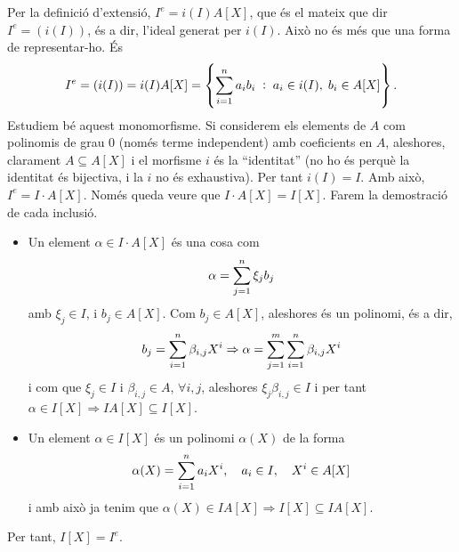 \documentclass[../main.tex]{subfiles}
\begin{document}
\begin{sol}
\begin{enumerate}[(a)]
    Per la definició d'extensió, $I^{e} = i(I) A[X]$, que és el mateix que dir $I^{e} = (i(I))$, és a dir, l'ideal generat per $i(I)$. Això no és més que una forma de representar-ho. És
    \begin{equation}
        \notag 
        I^{e}=(i(I)) = i(I)A[X] = \left\{\sum_{i=1}^n a_ib_i\;:\;a_i\in i(I),\;b_i\in A[X]\right\}.
    \end{equation}
    Estudiem bé aquest monomorfisme. Si considerem els elements de $A$ com polinomis de grau 0 (només terme independent) amb coeficients en $A$, aleshores, clarament $A\subseteq A[X]$ i el morfisme $i$ és la ``identitat'' (no ho és perquè la identitat és bijectiva, i la $i$ no és exhaustiva). Per tant $i(I) = I$. Amb això, $I^{e} = I\cdotp A[X]$. Només queda veure que $I\cdotp A[X] = I[X]$. Farem la demostració de cada inclusió.
    \begin{itemize}
        \item \fbox{$\subseteq$} Un element $\alpha\in I\cdotp A[X]$ és una cosa com
        \begin{equation}
            \notag
            \alpha = \sum_{j=1}^n\xi_jb_j
        \end{equation}
        amb $\xi_j\in I$, i $b_j\in A[X]$. Com $b_j\in A[X]$, aleshores és un polinomi, és a dir,
        \begin{equation}
            \notag
            b_j = \sum_{i=1}^n\beta_{i,j}X^{i}\Rightarrow \alpha = \sum_{j=1}^m\sum_{i=1}^n\beta_{i,j}X^{i}
        \end{equation}
        i com que $\xi_j\in I$ i $\beta_{i,j}\in A$, $\forall i,j$, aleshores $\xi_j\beta_{i,j}\in I$ i per tant $\alpha\in I[X]\Rightarrow IA[X]\subseteq I[X]$.
        \item \fbox{$\supseteq$} Un element $\alpha\in I[X]$ és un polinomi $\alpha(X)$ de la forma
        \begin{equation}
            \notag
            \alpha(X) = \sum_{i=1}^na_iX^{i},\quad a_i\in I,\quad X^{i}\in A[X]
        \end{equation}
        i amb això ja tenim que $\alpha(X)\in IA[X]\Rightarrow I[X] \subseteq IA[X]$.
    \end{itemize}
    Per tant, $I[X] = I^{e}$.
    

\end{enumerate}
\end{sol}
\end{document}
